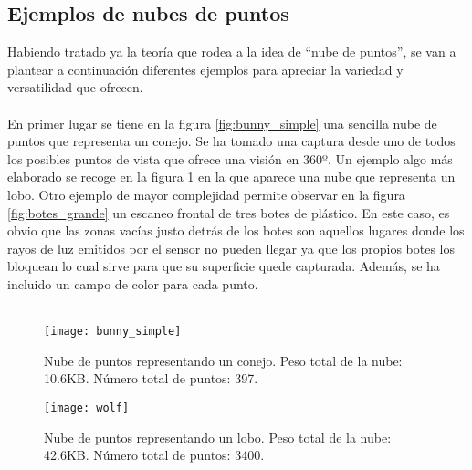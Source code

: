 \subsection*{Ejemplos de nubes de puntos}
Habiendo tratado ya la teoría que rodea a la idea de ``nube de puntos'', se van a plantear a continuación diferentes ejemplos para apreciar la variedad y versatilidad que ofrecen.
\\
\\
En primer lugar se tiene en la figura \ref{fig:bunny_simple} una sencilla nube de puntos que representa un conejo. Se ha tomado una captura desde uno de todos los posibles puntos de vista que ofrece una visión en 360º.
Un ejemplo algo más elaborado se recoge en la figura \ref{fig:wolf} en la que aparece una nube que representa un lobo. 
Otro ejemplo de mayor complejidad permite observar en la figura \ref{fig:botes_grande} un escaneo frontal de tres botes de plástico. En este caso, es obvio que las zonas vacías justo detrás de los botes son aquellos lugares donde los rayos de luz emitidos por el sensor no pueden llegar ya que los propios botes los bloquean lo cual sirve para que su superficie quede capturada. Además, se ha incluido un campo de color para cada punto.
\\
\\
\begin{figure}[!htb]
  \texttt{[image: bunny\_simple]}
  \caption{Nube de puntos representando un conejo.
  Peso total de la nube: 10.6KB.
  Número total de puntos: 397.}\label{fig:bunny_simple}
\endminipage\hfill
{}
  \texttt{[image: wolf]}
  \caption{Nube de puntos representando un lobo.
  Peso total de la nube: 42.6KB.
  Número total de puntos: 3400.}\label{fig:wolf}
\endminipage\hfill
\end{figure}


